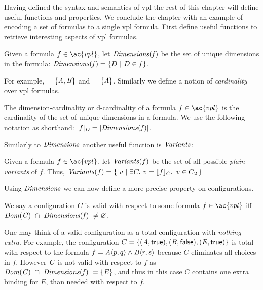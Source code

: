 %
Having defined the syntax and semantics of \ac{vpl} the rest of this chapter
will define useful functions and properties. We conclude the chapter with an
example of encoding a set of \pl{} formulas to a single \ac{vpl} formula.
%
First define useful functions to retrieve interesting aspects of \ac{vpl}
formulas.

\begin{definition}[Dimensions]
  Given a formula $f \in \ac{vpl}$, let $\mathit{Dimensions(f)}$ be the set of unique
  dimensions in the formula:  $\mathit{Dimensions(f)} = \{ D\ |\ D \in f \}$.
\end{definition}

For example,  = $\{\mathit{A,B}\}$ and
 = $\{\mathit{A}\}$.
%
Similarly we define a notion of \emph{cardinality} over \ac{vpl} formulas.
%
\begin{definition}
  The dimension-cardinality or d-cardinality of a formula $f \in \ac{vpl}$ is
  the cardinality of the set of unique dimensions in a formula. We use the
  following notation as shorthand: $|f|_{D} = |{\mathit{Dimensions(f)}}|$.
\end{definition}

Similarly to $\mathit{Dimensions}$ another useful function is $\mathit{Variants}$:

\begin{definition}[Variants]
  Given a formula $f \in \ac{vpl}$, let $\mathit{Variants}(f)$ be the set of all
  possible \emph{plain variants} of $f$. Thus, $\variants{f} = \{\ v\ |\ \exists C.\
  v = \sem[C]{f},\ v \in \pl{} \,\}$
\end{definition}

Using $\mathit{Dimensions}$ we can now define a more precise property on
configurations.
%
\begin{definition}
  We say a configuration $C$ is valid with respect to some formula $f \in
  \ac{vpl}$ iff $\kf{Dom(C)}\ \cap\ \kf{Dimensions(\kf{f})\ \neq \varnothing}$.
\end{definition}

One may think of a valid configuration as a total configuration with
\emph{nothing extra}. For example, the configuration $C = \{\kf{(A,\true),
  (B,\false),(E,\true)}\}$ is total with respect to the formula $f =
\chc[A]{p,q}\wedge\chc[B]{r,s}$ because $C$ eliminates all choices in $f$.
However $\mathit{C}$ is not valid with respect to $f$ as $\mathit{Dom(C)}\ \cap\
\mathit{Dimensions(\mathit{f})\ = \{\mathit{E}\}}$, and thus in this case $C$ contains one
extra binding for $E$, than needed with respect to $f$.

